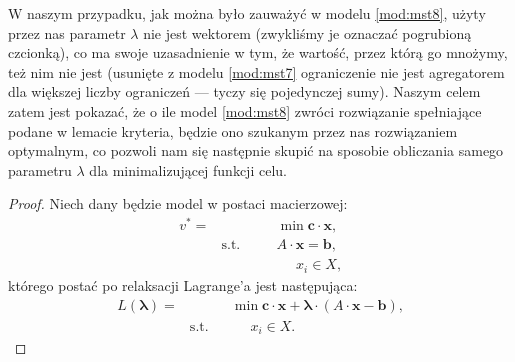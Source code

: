 W naszym przypadku, jak można było zauważyć w modelu \ref{mod:mst8}, użyty przez nas parametr $\lambda$ nie jest wektorem (zwykliśmy je oznaczać pogrubioną czcionką), co ma swoje uzasadnienie w tym, że wartość, przez którą go mnożymy, też nim nie jest (usunięte z modelu \ref{mod:mst7} ograniczenie nie jest agregatorem dla większej liczby ograniczeń --- tyczy się pojedynczej sumy). Naszym celem zatem jest pokazać, że o ile model \ref{mod:mst8} zwróci rozwiązanie spełniające podane w lemacie kryteria, będzie ono szukanym przez nas rozwiązaniem optymalnym, co pozwoli nam się następnie skupić na sposobie obliczania samego parametru $\lambda$ dla minimalizującej funkcji celu.

\begin{proof}
	Niech dany będzie model w postaci macierzowej:
	\begin{subequations}
		\begin{alignat}{4}
		v^{\ast} = & & & \min \textbf{c} \cdot \textbf{x}\text{,} \\
		& \text{s.t.} & \quad & A \cdot \textbf{x} = \textbf{b},\\
		& & & \phantom{\sum} x_{i} \in X\text{,}
		\end{alignat}\label{mod:relax1}
	\end{subequations}
	którego postać po relaksacji Lagrange'a jest następująca:
	\begin{subequations}
		\begin{alignat}{4}
		L \left( \boldsymbol{\lambda} \right) = & & & \min \textbf{c} \cdot \textbf{x} + \boldsymbol{\lambda} \cdot \left( A \cdot \textbf{x} - \textbf{b} \right)\text{,} \\
		& \text{s.t.} & & \phantom{\sum} x_{i} \in X\text{.}
		\end{alignat}\label{mod:relax2}
	\end{subequations}
	

\end{proof}

